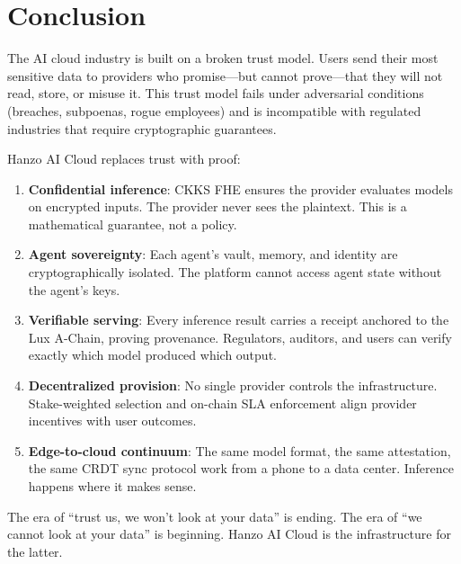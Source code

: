 \section{Conclusion}

\label{sec:conclusion}

The AI cloud industry is built on a broken trust model. Users send their most
sensitive data to providers who promise---but cannot prove---that they will not
read, store, or misuse it. This trust model fails under adversarial conditions
(breaches, subpoenas, rogue employees) and is incompatible with regulated
industries that require cryptographic guarantees.

Hanzo AI Cloud replaces trust with proof:

\begin{enumerate}[leftmargin=1.4em]
    \item \textbf{Confidential inference}: CKKS FHE ensures the provider
    evaluates models on encrypted inputs. The provider never sees the
    plaintext. This is a mathematical guarantee, not a policy.
    \item \textbf{Agent sovereignty}: Each agent's vault, memory, and identity
    are cryptographically isolated. The platform cannot access agent state
    without the agent's keys.
    \item \textbf{Verifiable serving}: Every inference result carries a
    receipt anchored to the Lux A-Chain, proving provenance. Regulators,
    auditors, and users can verify exactly which model produced which output.
    \item \textbf{Decentralized provision}: No single provider controls the
    infrastructure. Stake-weighted selection and on-chain SLA enforcement
    align provider incentives with user outcomes.
    \item \textbf{Edge-to-cloud continuum}: The same model format, the same
    attestation, the same CRDT sync protocol work from a phone to a data
    center. Inference happens where it makes sense.
\end{enumerate}

The era of ``trust us, we won't look at your data'' is ending. The era of
``we cannot look at your data'' is beginning. Hanzo AI Cloud is the
infrastructure for the latter.

